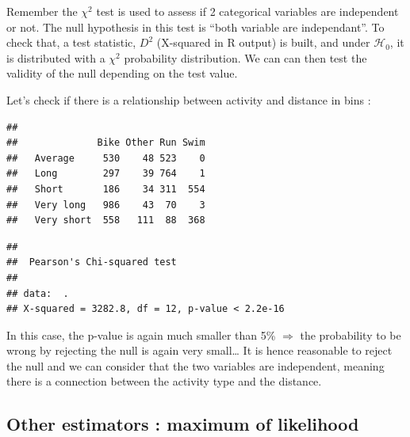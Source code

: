 \documentclass[
]{book}
\newenvironment{Shaded}{\begin{snugshade}}{\end{snugshade}}
\newcommand{\KeywordTok}[1]{\textcolor[rgb]{0.13,0.29,0.53}{\textbf{#1}}}
\newcommand{\NormalTok}[1]{#1}
\newcommand{\OperatorTok}[1]{\textcolor[rgb]{0.81,0.36,0.00}{\textbf{#1}}}
\newcommand{\StringTok}[1]{\textcolor[rgb]{0.31,0.60,0.02}{#1}}
\begin{document}
Remember the \(\chi^2\) test is used to assess if 2 categorical variables are independent or not. The null hypothesis in this test is ``both variable are independant''. To check that, a test statistic, \(D^2\) (X-squared in R output) is built, and under \(\mathcal{H_0}\), it is distributed with a \(\chi^2\) probability distribution. We can can then test the validity of the null depending on the test value.

Let's check if there is a relationship between activity and distance in bins :

\begin{Shaded}
\end{Shaded}

\begin{verbatim}
##             
##              Bike Other Run Swim
##   Average     530    48 523    0
##   Long        297    39 764    1
##   Short       186    34 311  554
##   Very long   986    43  70    3
##   Very short  558   111  88  368
\end{verbatim}

\begin{Shaded}
\end{Shaded}

\begin{verbatim}
## 
## 	Pearson's Chi-squared test
## 
## data:  .
## X-squared = 3282.8, df = 12, p-value < 2.2e-16
\end{verbatim}

In this case, the p-value is again much smaller than 5\% \(\Rightarrow\) the probability to be wrong by rejecting the null is again very small\ldots{} It is hence reasonable to reject the null and we can consider that the two variables are independent, meaning there is a connection between the activity type and the distance.

\hypertarget{other-estimators-maximum-of-likelihood}{%
\subsection{Other estimators : maximum of likelihood}\label{other-estimators-maximum-of-likelihood}}
\end{document}
